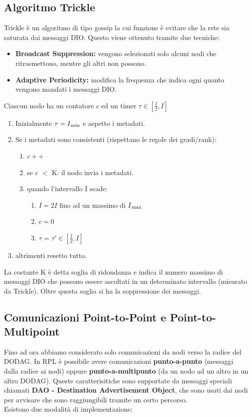 \documentclass{article}
\begin{document}
\subsection{Algoritmo Trickle}
Trickle è un algoritmo di tipo gossip la cui funzione è evitare che la rete sia saturata dai messaggi DIO. Questo viene ottenuto tramite due tecniche:
\begin{itemize}
    \item \textbf{Broadcast Suppression:} vengono selezionati solo alcuni nodi che ritrasmettono, mentre gli altri non possono.
    \item \textbf{Adaptive Periodicity:} modifica la frequenza che indica ogni quanto vengono mandati i messaggi DIO.
\end{itemize}
Ciascun nodo ha un contatore \(\displaystyle c\) ed un timer \(\displaystyle\tau \in [\frac{I}{2}, I]\)
\begin{enumerate}
    \item Inizialmente \(\displaystyle \tau = I\textsubscript{min}\) e aspetto i metadati.
    \item Se i metadati sono consistenti (rispettano le regole dei gradi/rank):
    \begin{enumerate}
        \item \(\displaystyle c++\)
        \item se c $<$ K: il nodo invia i metadati.
        \item quando l'intervallo I scade:
        \begin{enumerate}
            \item \(\displaystyle I = 2I\) fino ad un massimo di \(\displaystyle I\textsubscript{max}\)
            \item \(\displaystyle c=0\)
            \item \(\displaystyle \tau\) = \(\displaystyle \tau' \in [\frac{I}{2}, I]\)
        \end{enumerate}
    \end{enumerate}
    \item altrimenti resetto tutto.
\end{enumerate}
La costante K è detta soglia di ridondanza e indica il numero massimo di messaggi DIO che possono essere ascoltati in un determinato intervallo (misurato da Trickle). Oltre questa soglia si ha la soppressione dei messaggi.

\subsection{Comunicazioni Point-to-Point e Point-to-Multipoint}
Fino ad ora abbiamo considerato solo comunicazioni da nodi verso la radice del DODAG. In RPL è possibile avere comunicazioni \textbf{punto-a-punto} (messaggi dalla radice ai nodi) oppure \textbf{punto-a-multipunto} (da un nodo ad un altro in un altro DODAG). Queste caratterisitiche sono supportate da messaggi speciali chiamati \textbf{DAO - Destination Advertisement Object}, che sono usati dai nodi per avvisare che sono raggiungibili tramite un certo percorso.\\
Esistono due modalità di implementazione:
\end{document}
